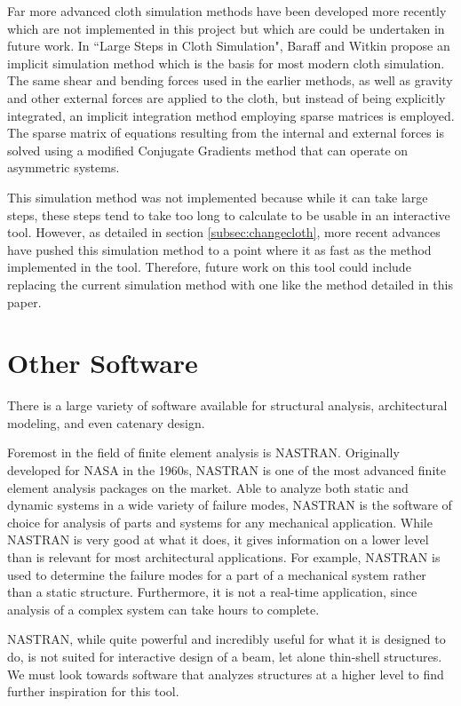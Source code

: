 \documentclass{thesis}
\begin{document}
Far more advanced cloth simulation methods have been developed more recently which are not implemented in
this project but which are could be undertaken in future work.  In ``Large Steps in Cloth Simulation"\cite{baraff98largesteps},
Baraff and Witkin propose an implicit simulation method which is the basis for most modern cloth simulation.
The same shear and bending forces used in the earlier methods, as well as gravity and other external forces
are applied to the cloth, but instead of being explicitly integrated, an implicit integration method employing
sparse matrices is employed.  The sparse matrix of equations resulting from the internal and external forces
is solved using a modified Conjugate Gradients method that can operate on asymmetric systems.

This simulation method was not implemented because while it can take large steps, these steps tend to take
too long to calculate to be usable in an interactive tool.  However, as detailed in section \ref{subsec:changecloth},
more recent advances have pushed this simulation method to a point where it as fast as the method implemented in
the tool.  Therefore, future work on this tool could include replacing the current simulation method with one
like the method detailed in this paper.

\section{Other Software}
There is a large variety of software available for structural analysis, architectural modeling, and even
catenary design.

Foremost in the field of finite element analysis is NASTRAN\cite{NASTRAN}.  Originally developed for NASA in
the 1960s, NASTRAN is one of the most advanced finite element analysis packages on the market.  Able to
analyze both static and dynamic systems in a wide variety of failure modes, NASTRAN is the software
of choice for analysis of parts and systems for any mechanical application.  While NASTRAN is very good
at what it does, it gives information on a lower level than is relevant for most architectural applications.
For example, NASTRAN is used to determine the failure modes for a part of a mechanical system rather than
a static structure.  Furthermore, it is not a real-time application, since analysis of a complex system can take
hours to complete.

NASTRAN, while quite powerful and incredibly useful for what it is designed to do, is not suited for interactive
design of a beam, let alone thin-shell structures.  We must look towards software that analyzes structures at a
higher level to find further inspiration for this tool.
\end{document}
